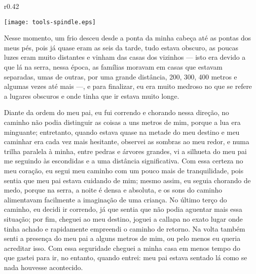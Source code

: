 \ifdefined\EnableIncludeImages
\begin{wrapfigure}{r}{0.42\textwidth}
  \begin{center}
  \vspace{-10pt}
    \texttt{[image: tools-spindle.eps]}
  \end{center}
  \vspace{-20pt}
\end{wrapfigure}
\fi
Nesse momento, um frio desceu desde a ponta da minha cabeça até as pontas dos meus pés, pois já quase eram as seis da tarde, tudo estava obscuro, as poucas luzes eram muito distantes e vinham das casas dos vizinhos --- isto era devido a que lá na serra, nessa época, as famílias moravam em casas que estavam separadas, umas de outras, por uma grande distância, 200, 300, 400 metros e algumas vezes até mais ---, e para finalizar, eu era muito medroso no que se refere a lugares obscuros e onde tinha que ir estava muito longe.

Diante da ordem do meu pai, eu fui correndo e chorando nessa direção, no caminho não podia distinguir as coisas a uns metros de mim, porque a lua era minguante; entretanto, quando estava quase na metade do meu destino e meu caminhar era cada vez mais hesitante, observei as sombras ao meu redor, e numa trilha paralela à minha, entre pedras e árvores grandes, vi a silhueta do meu pai me seguindo às escondidas e a uma distância significativa.
Com essa certeza no meu coração, eu segui meu caminho com um pouco mais de tranquilidade, pois sentia que meu pai estava cuidando de mim; mesmo assim, eu seguia chorando de medo, porque na serra, a noite é densa e absoluta, e os sons do caminho alimentavam facilmente a imaginação de uma criança.
No último terço do caminho, eu decidi ir correndo, já que sentia que não podia aguentar mais essa situação; por fim, cheguei ao meu destino, joguei a callapa no exato lugar onde tinha achado e rapidamente empreendi o caminho de retorno.
Na volta também senti a presença do meu pai a alguns metros de mim, ou pelo menos eu queria acreditar isso. Com essa seguridade cheguei a minha casa em menos tempo do que gastei para ir, no entanto, quando entrei: meu pai estava sentado lá como se nada houvesse acontecido.


